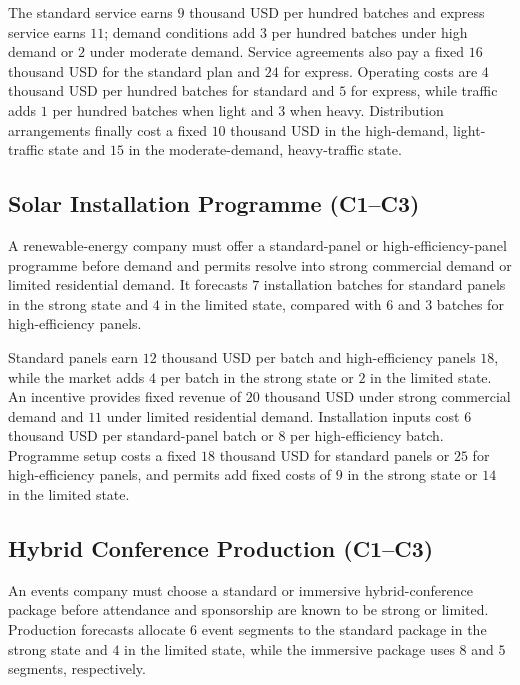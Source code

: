 	The standard service earns \(9\) thousand USD per hundred batches and express service earns \(11\); demand conditions add \(3\) per hundred batches under high demand or \(2\) under moderate demand. Service agreements also pay a fixed \(16\) thousand USD for the standard plan and \(24\) for express. Operating costs are \(4\) thousand USD per hundred batches for standard and \(5\) for express, while traffic adds \(1\) per hundred batches when light and \(3\) when heavy. Distribution arrangements finally cost a fixed \(10\) thousand USD in the high-demand, light-traffic state and \(15\) in the moderate-demand, heavy-traffic state.

	\subsection{Solar Installation Programme (C1--C3)}
	\label{sec:problem16-solar-installation-programme-c1-c3}

	A renewable-energy company must offer a standard-panel or high-efficiency-panel programme before demand and permits resolve into strong commercial demand or limited residential demand. It forecasts \(7\) installation batches for standard panels in the strong state and \(4\) in the limited state, compared with \(6\) and \(3\) batches for high-efficiency panels.

	Standard panels earn \(12\) thousand USD per batch and high-efficiency panels \(18\), while the market adds \(4\) per batch in the strong state or \(2\) in the limited state. An incentive provides fixed revenue of \(20\) thousand USD under strong commercial demand and \(11\) under limited residential demand. Installation inputs cost \(6\) thousand USD per standard-panel batch or \(8\) per high-efficiency batch. Programme setup costs a fixed \(18\) thousand USD for standard panels or \(25\) for high-efficiency panels, and permits add fixed costs of \(9\) in the strong state or \(14\) in the limited state.

	\subsection{Hybrid Conference Production (C1--C3)}
	\label{sec:problem17-hybrid-conference-production-c1-c3}

	An events company must choose a standard or immersive hybrid-conference package before attendance and sponsorship are known to be strong or limited. Production forecasts allocate \(6\) event segments to the standard package in the strong state and \(4\) in the limited state, while the immersive package uses \(8\) and \(5\) segments, respectively.

